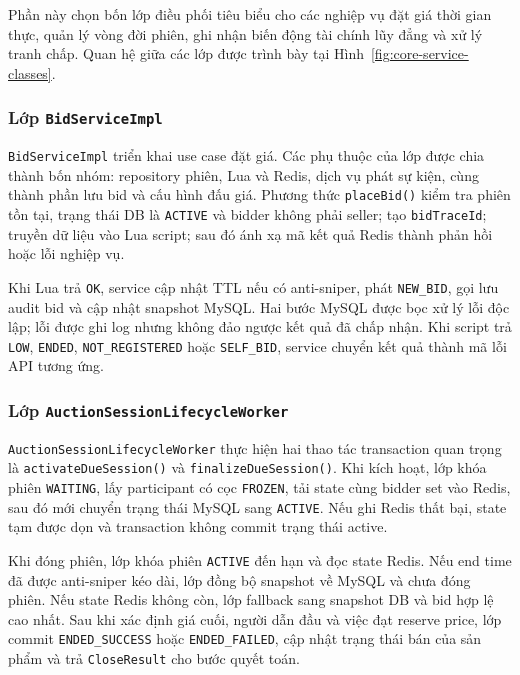 \documentclass[../DoAn.tex]{subfiles}
\begin{document}
Phần này chọn bốn lớp điều phối tiêu biểu cho các nghiệp vụ đặt giá thời gian thực, quản lý vòng đời phiên, ghi nhận biến động tài chính lũy đẳng và xử lý tranh chấp. Quan hệ giữa các lớp được trình bày tại Hình~\ref{fig:core-service-classes}.

\subsubsection{Lớp \texttt{BidServiceImpl}}

\texttt{BidServiceImpl} triển khai use case đặt giá. Các phụ thuộc của lớp được chia thành bốn nhóm: repository phiên, Lua và Redis, dịch vụ phát sự kiện, cùng thành phần lưu bid và cấu hình đấu giá. Phương thức \texttt{placeBid()} kiểm tra phiên tồn tại, trạng thái DB là \texttt{ACTIVE} và bidder không phải seller; tạo \texttt{bidTraceId}; truyền dữ liệu vào Lua script; sau đó ánh xạ mã kết quả Redis thành phản hồi hoặc lỗi nghiệp vụ.

Khi Lua trả \texttt{OK}, service cập nhật TTL nếu có anti-sniper, phát \texttt{NEW\_BID}, gọi lưu audit bid và cập nhật snapshot MySQL. Hai bước MySQL được bọc xử lý lỗi độc lập; lỗi được ghi log nhưng không đảo ngược kết quả đã chấp nhận. Khi script trả \texttt{LOW}, \texttt{ENDED}, \texttt{NOT\_REGISTERED} hoặc \texttt{SELF\_BID}, service chuyển kết quả thành mã lỗi API tương ứng.

\subsubsection{Lớp \texttt{AuctionSessionLifecycleWorker}}

\texttt{AuctionSessionLifecycleWorker} thực hiện hai thao tác transaction quan trọng là \texttt{activateDueSession()} và \texttt{finalizeDueSession()}. Khi kích hoạt, lớp khóa phiên \texttt{WAITING}, lấy participant có cọc \texttt{FROZEN}, tải state cùng bidder set vào Redis, sau đó mới chuyển trạng thái MySQL sang \texttt{ACTIVE}. Nếu ghi Redis thất bại, state tạm được dọn và transaction không commit trạng thái active.

Khi đóng phiên, lớp khóa phiên \texttt{ACTIVE} đến hạn và đọc state Redis. Nếu end time đã được anti-sniper kéo dài, lớp đồng bộ snapshot về MySQL và chưa đóng phiên. Nếu state Redis không còn, lớp fallback sang snapshot DB và bid hợp lệ cao nhất. Sau khi xác định giá cuối, người dẫn đầu và việc đạt reserve price, lớp commit \texttt{ENDED\_SUCCESS} hoặc \texttt{ENDED\_FAILED}, cập nhật trạng thái bán của sản phẩm và trả \texttt{CloseResult} cho bước quyết toán.
\end{document}
